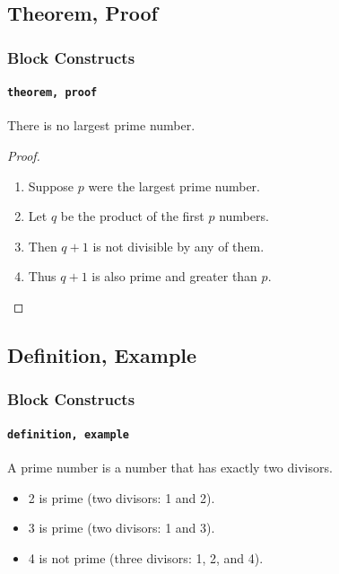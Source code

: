 \subsection{Theorem, Proof}
\begin{frame}
        \frametitle{Block Constructs}
        \framesubtitle{{\tt theorem, proof}}
        \begin{theorem}
        There is no largest prime number.
        \end{theorem}

        \begin{proof}
                \begin{enumerate}
                        \item<1-| alert@1> Suppose $p$ were the largest prime number.
                        \item<2-> Let $q$ be the product of the first $p$ numbers.
                        \item<3-> Then $q+1$ is not divisible by any of them.
                        \item<1-> Thus $q+1$ is also prime and greater than $p$.\qedhere
                \end{enumerate}
        \end{proof}
\end{frame}

\subsection{Definition, Example}
\begin{frame}
        \frametitle{Block Constructs}
        \framesubtitle{{\tt definition, example}}
        \begin{definition}
                A \alert{prime number} is a number that has exactly two divisors.
        \end{definition}
        \begin{example}
                \begin{itemize}
                        \item 2 is prime (two divisors: 1 and 2).
                        \item 3 is prime (two divisors: 1 and 3).
                        \item 4 is not prime (\alert{three} divisors: 1, 2, and 4).
                \end{itemize}
        \end{example}
\end{frame}

